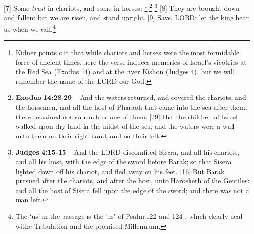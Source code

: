 [7] \textcolor[rgb]{0.00,0.00,1.00}{Some \emph{trust} in chariots, and some in horses:} \footnote{Kidner points out that while chariots and horses were the most formidable force of ancient times, here the verse induces memories of Israel's vicotries at the Red Sea (Exodus 14) and at the river Kishon (Judges 4). \cite{kidner2014psalms} but we will remember the name of the LORD our God.} \footnote{\textbf{Exodus 14:28-29} -- And the waters returned, and covered the chariots, and the horsemen, and all the host of Pharaoh that came into the sea after them; there remained not so much as one of them. [29] But the children of Israel walked upon dry land in the midst of the sea; and the waters were a wall unto them on their right hand, and on their left.} \footnote{\textbf{Judges 4:15-15} -- And the LORD discomfited Sisera, and all his chariots, and all his host, with the edge of the sword before Barak; so that Sisera lighted down off his chariot, and fled away on his feet. [16] But Barak pursued after the chariots, and after the host, unto Harosheth of the Gentiles: and all the host of Sisera fell upon the edge of the sword; and there was not a man left.}
[8] \textcolor[rgb]{0.00,0.00,1.00}{They are brought down and fallen: but we are risen, and stand upright.}
[9] \textcolor[rgb]{0.00,0.00,1.00}{Save, LORD: let the king hear us when we call.}\footnote{The `us' in the passage is the `us' of Psalm 122 and 124 , which clearly deal withe Tribulation and the promised Millennium.\cite{Ruckman1992Psalms} }

